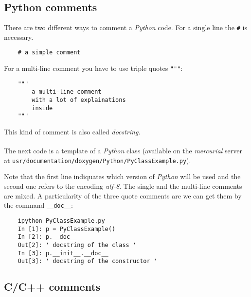 \documentclass[a4paper, 12pt, oneside]{report}
\begin{document}
\subsection{Python comments}
There are two different ways to comment a \textit{Python} code. For a single line the \verb|#| is necessary.
\begin{verbatim}
	# a simple comment
\end{verbatim}
For a multi-line comment you have to use triple quotes \verb|"""|:
\begin{verbatim}
	"""
	    a multi-line comment
	    with a lot of explainations
	    inside
	"""
\end{verbatim}
This kind of comment is also called \textit{docstring}.\\
\\
The next code is a template of a \textit{Python} class (available on the \textit{mercurial} server at \texttt{usr/documentation/doxygen/Python/PyClassExample.py}). 

Note that the first line indiquates which version of \textit{Python} will be used and the second one refers to the encoding \textit{utf-8}. The single  and the multi-line comments are mixed. A particularity of the three quote comments are we can get them by the command \verb|__doc__|:
\begin{verbatim}
	ipython PyClassExample.py
	In [1]: p = PyClassExample()
	In [2]: p.__doc__
	Out[2]: ' docstring of the class '
	In [3]: p.__init__.__doc__
	Out[3]: ' docstring of the constructor '
\end{verbatim}





\subsection{C/C++ comments}
\end{document}
